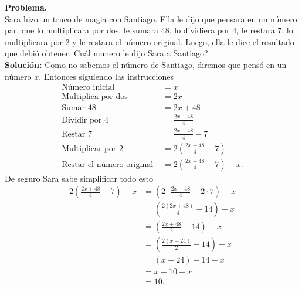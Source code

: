 \begin{ejemplo}{\textbf{Problema.} \\}
	Sara hizo un truco de magia con Santiago. Ella le dijo que pensara en un número par, que lo multiplicara por dos, le sumara 48, lo dividiera por 4, le restara 7, lo multiplicara por 2 y le restara el número original. Luego, ella le dice el resultado que debió obtener. Cuál numero le dijo Sara a Santiago?\\
	\textbf{Solución: }Como no sabemos el número de Santiago, diremos que pensó en un número $x$. Entonces siguiendo las instrucciones
	\begin{align*}
	\text{Número inicial }&=x\\
	\text{Multiplica por dos }&=2x\\
	\text{Sumar 48 }&=2x+48\\
	\text{Dividir por 4  }&=\frac{2x+48}{4}\\						
	\text{Restar 7  }&=\frac{2x+48}{4} - 7\\					
	\text{Multiplicar por 2}&=2\left(\frac{2x+48}{4} - 7\right) \\					
	\text{Restar el número original  }&=2\left(\frac{2x+48}{4} - 7\right)-x.
	\end{align*}
	De seguro Sara sabe simplificar todo esto
	\begin{align*}
	2\left(\frac{2x+48}{4} - 7\right)-x &= \left(2\cdot\frac{2x+48}{4} - 2\cdot 7\right)-x\\
	&=\left(\frac{2(2x+48)}{4} - 14\right)-x\\
	&= \left(\frac{2x+48}{2} - 14\right)-x\\
	&= \left(\frac{2(x+24)}{2} - 14\right)-x\\		
	&= (x+24)- 14-x\\				
	&=x+10-x\\
	&=10.
	\end{align*}
\end{ejemplo}

